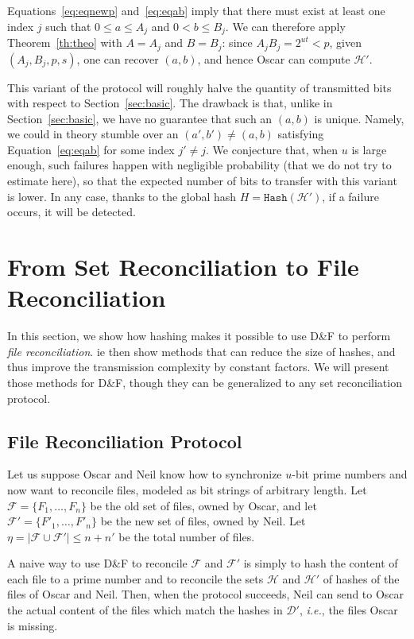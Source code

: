 \documentclass[11pt]{llncs}
\newcommand{\Set}{\mathcal{H}}
\newcommand{\SetD}{\mathcal{D}}
\newcommand{\Files}{\mathcal{F}}
\newcommand{\df}{D\&F\xspace}
\newcommand{\ie}{\textit{i.e.}\xspace}
\newcommand{\Hash}{\ensuremath{\mathtt{Hash}}}
\begin{document}
Equations~\eqref{eq:eqnewp} and~\eqref{eq:eqab} imply that there must exist at least one index $j$ such that $0 \leq a \leq A_j$ and $0 <b \leq B_j$. 
We can therefore apply Theorem~\ref{th:theo} with $A = A_j$ and $B = B_j$: since $A_j B_j = 2^{ut} < p$, given $(A_j,B_j,p,s)$, one can recover $(a,b)$, and hence Oscar can compute $\Set'$.

This variant of the protocol will roughly halve the quantity of transmitted bits with respect to Section~\ref{sec:basic}.
The drawback is that, unlike in Section~\ref{sec:basic}, we have no guarantee that such an $(a,b)$ is unique. Namely, we could in theory stumble over an $(a',b')\neq (a,b)$ satisfying Equation~\eqref{eq:eqab} for some index $j' \neq j$. We conjecture that, when $u$ is large enough, such failures happen with negligible probability (that we do not try to estimate here), so that the expected number of bits to transfer with this variant is lower.
In any case, thanks to the global hash $H = \Hash(\Set')$, if a failure occurs, it will be detected.

\section{From Set Reconciliation to File Reconciliation}
\label{sec:hashing}

In this section, we show how hashing makes it possible to use \df to perform \emph{file reconciliation}.
ie then show methods that can reduce the size of hashes, and thus improve the transmission complexity by constant factors. We will present those methods for \df, though they can be generalized to any set reconciliation protocol.

\subsection{File Reconciliation Protocol}

Let us suppose Oscar and Neil know how to synchronize $u$-bit prime numbers and now want to reconcile files, modeled as bit strings of arbitrary length.
Let $\Files = \{F_1,\dots,F_n\}$ be the old set of files, owned by Oscar, and let $\Files' = \{F'_1,\dots,F'_n\}$ be the new set of files, owned by Neil.
Let $\eta = | \Files \cup \Files'| \le n+n'$ be the total number of files.

A naive way to use \df to reconcile $\Files$ and $\Files'$ is simply to hash the content of each file to a prime number and to reconcile the sets $\Set$ and $\Set'$ of hashes of the files of Oscar and Neil.
Then, when the protocol succeeds, Neil can send to Oscar the actual content of the files which match the hashes in $\SetD'$, \ie, the files Oscar is missing.
\end{document}
